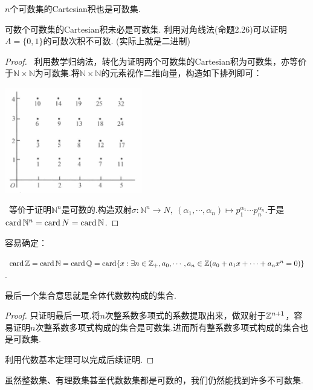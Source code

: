 \begin{proposition}{}
	$n$个可数集的Cartesian积也是可数集.
\end{proposition}
\begin{remark}
	可数个可数集的Cartesian积未必是可数集. 利用对角线法(命题2.26)可以证明$A=\{ 0,1 \}$的可数次积不可数. (实际上就是二进制)
\end{remark}
\begin{proof}
	~利用数学归纳法，转化为证明两个可数集的Cartesian积为可数集，亦等价于$\mathbb{N} \times \mathbb{N}$为可数集.将$\mathbb{N} \times \mathbb{N}$的元素视作二维向量，构造如下排列即可：
	\begin{center}
		\includegraphics[width=6cm]{attachment/iShot_2023-08-04_15.19.06.png}
	\end{center}
	
	~等价于证明$\mathbb{N}^n$是可数的.构造双射$\sigma :\mathbb{N}^n \to N,~(\alpha _1, \cdots ,\alpha _n) \mapsto p_1^{\alpha _1} \cdots p_n^{\alpha _n}$.于是$\operatorname{card} \mathbb{N}^n = \operatorname{card} N = \operatorname{card} \mathbb{N}$.
\end{proof}

容易确定：

\begin{proposition}
	$\operatorname{card} \mathbb{Z} = \operatorname{card} \mathbb{N} = \operatorname{card} \mathbb{Q} = \operatorname{card} \{ x:\exists n \in \mathbb{Z}_+,a_0, \cdots ,a_n \in \mathbb{Z}(a_0+a_1x+\cdots +a_nx^n=0) \}$.
\end{proposition}
\begin{remark}
	最后一个集合意思就是全体代数数构成的集合.
\end{remark}
\begin{proof}
	只证明最后一项.将$n$次整系数多项式的系数提取出来，做双射于$\mathbb{Z} ^{n+1}$，容易证明$n$次整系数多项式构成的集合是可数集.进而所有整系数多项式构成的集合也是可数集.
	
	利用代数基本定理可以完成后续证明.
\end{proof}

虽然整数集、有理数集甚至代数数集都是可数的，我们仍然能找到许多不可数集.

